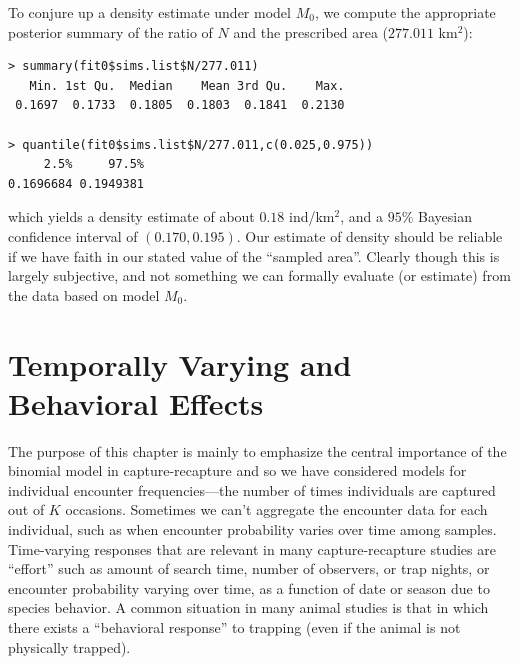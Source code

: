 To conjure up a
density estimate under model $M_0$, we compute the appropriate
posterior summary of the ratio of $N$ and the prescribed area ($277.011$ km$^2$):
{\small
\begin{verbatim}
> summary(fit0$sims.list$N/277.011)
   Min. 1st Qu.  Median    Mean 3rd Qu.    Max.
 0.1697  0.1733  0.1805  0.1803  0.1841  0.2130

> quantile(fit0$sims.list$N/277.011,c(0.025,0.975))
     2.5%     97.5%
0.1696684 0.1949381
\end{verbatim}
}
{\flushleft which } yields a density estimate of about $0.18$ ind/km$^2$, and a $95\%$ Bayesian
confidence interval of $(0.170, 0.195)$.
Our estimate of density should be reliable if we have faith in our
stated value of the ``sampled area''. Clearly though this is largely
subjective, and not something we can formally evaluate (or estimate)
from the data based on model $M_{0}$. 


\section{Temporally Varying and Behavioral Effects}
\label{closed.sec.timebehavefx}

The purpose of this chapter is mainly to emphasize the central
importance of the binomial model in capture-recapture and so we have
considered models for individual encounter frequencies---the number of
times individuals are captured out of $K$ occasions.  Sometimes we
can't aggregate the encounter data for each individual, such as when
encounter probability varies over time among samples.  Time-varying
responses that are relevant in many capture-recapture studies are
``effort'' such as amount of search time, number of observers, or trap
nights, or encounter probability varying over time, as a function of
date or season \citep{kery_etal:2010} due to species behavior.  A
common situation in many animal studies is that in which there exists
a ``behavioral response'' to trapping (even if the animal is not
physically trapped).


